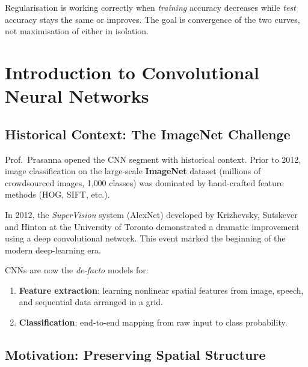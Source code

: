 \documentclass[12pt,a4paper]{article}
\begin{document}
\begin{keyinsight}
  Regularisation is working correctly when \emph{training} accuracy
  decreases while \emph{test} accuracy stays the same or improves.  The
  goal is convergence of the two curves, not maximisation of either in
  isolation.
\end{keyinsight}

\section{Introduction to Convolutional Neural Networks}
\label{sec:cnn_intro}

\subsection{Historical Context: The ImageNet Challenge}
\label{sec:cnn_intro:imagenet}

Prof.\ Prasanna opened the CNN segment with historical context.  Prior to
2012, image classification on the large-scale \textbf{ImageNet} dataset
(millions of crowdsourced images, 1{,}000 classes) was dominated by
hand-crafted feature methods (HOG, SIFT, etc.).

In 2012, the \emph{SuperVision} system (AlexNet) developed by Krizhevsky,
Sutskever and Hinton at the University of Toronto demonstrated a dramatic
improvement using a deep convolutional network.  This event marked the
beginning of the modern deep-learning era.

\begin{keyinsight}
  CNNs are now the \emph{de-facto} models for:
  \begin{enumerate}[noitemsep]
    \item \textbf{Feature extraction}: learning nonlinear spatial features
          from image, speech, and sequential data arranged in a grid.
    \item \textbf{Classification}: end-to-end mapping from raw input to
          class probability.
  \end{enumerate}
\end{keyinsight}

\subsection{Motivation: Preserving Spatial Structure}
\label{sec:cnn_intro:motivation}
\end{document}
